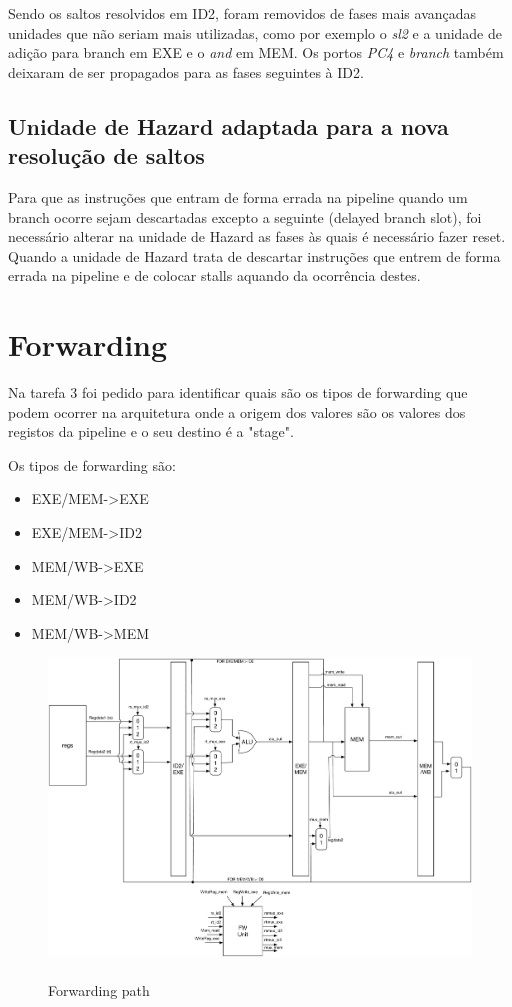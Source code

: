 \documentclass[pdftex,12pt,a4paper]{report}
\begin{document}
Sendo os saltos resolvidos em ID2, foram removidos de fases mais avançadas unidades que não seriam mais utilizadas, como por exemplo o \textit{sl2} e a unidade de adição para branch em EXE e o \textit{and} em MEM. Os portos \textit{PC4} e \textit{branch} também deixaram de ser propagados para as fases seguintes à ID2.

\subsection{Unidade de Hazard adaptada para a nova resolução de saltos}

Para que as instruções que entram de forma errada na pipeline quando um branch ocorre sejam descartadas excepto a seguinte (delayed branch slot), foi necessário alterar na unidade de Hazard as fases às quais é necessário fazer reset. Quando a unidade de Hazard trata de descartar instruções que entrem de forma errada na pipeline e de colocar stalls aquando da ocorrência destes.

\section{Forwarding}

Na tarefa 3 foi pedido para identificar quais são os tipos de forwarding que podem ocorrer na arquitetura onde a origem dos valores são os valores dos registos da pipeline e o seu destino é a "stage".

Os tipos de forwarding são:
\begin{itemize}
\item EXE/MEM->EXE
\item EXE/MEM->ID2
\item MEM/WB->EXE
\item MEM/WB->ID2
\item MEM/WB->MEM
\end{itemize} 

\newpage

\begin{figure}[!htb]
\center
 \includegraphics[width=150mm,scale=1]{path.pdf}
 \caption{\\ Forwarding path}
 \label{fig:path}
\end{figure}
\end{document}
